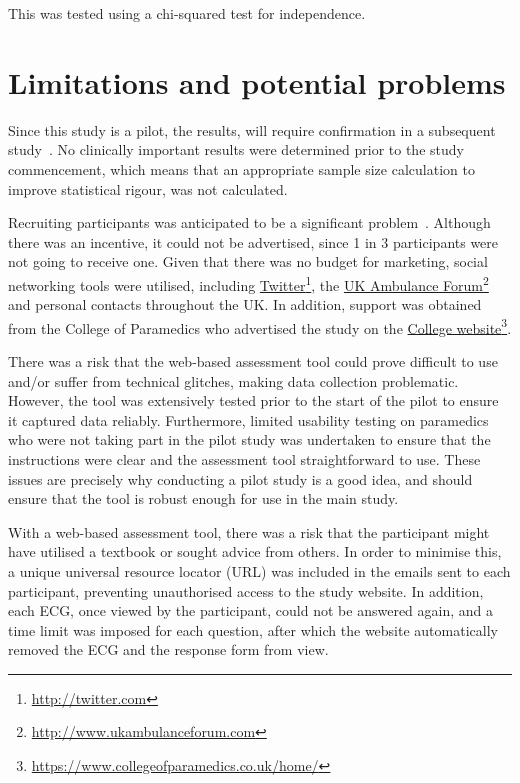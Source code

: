 This was tested using a chi-squared test for independence. 

\section{Limitations and potential problems}
\label{limitationsandpotentialproblems}

Since this study is a pilot, the results, will require confirmation in a subsequent study~\citep{torgerson_designing_2008}. No clinically important results were determined prior to the study commencement, which means that an appropriate sample size calculation to improve statistical rigour, was not calculated.

Recruiting participants was anticipated to be a significant problem~\citep{watson_increasing_2006}. Although there was an incentive, it could not be advertised, since 1 in 3 participants were not going to receive one. Given that there was no budget for marketing, social networking tools were utilised, including \href{http://twitter.com}{Twitter}\footnote{\href{http://twitter.com}{http:/\slash twitter.com}}, the \href{http://www.ukambulanceforum.com}{UK Ambulance Forum}\footnote{\href{http://www.ukambulanceforum.com}{http:/\slash www.ukambulanceforum.com}} and personal contacts throughout the UK. In addition, support was obtained from the College of Paramedics who advertised the study on the \href{https://www.collegeofparamedics.co.uk/home/}{College website}\footnote{\href{https://www.collegeofparamedics.co.uk/home/}{https:/\slash www.collegeofparamedics.co.uk\slash home\slash }}.

There was a risk that the web-based assessment tool could prove difficult to use and\slash or suffer from technical glitches, making data collection problematic. However, the tool was extensively tested prior to the start of the pilot to ensure it captured data reliably. Furthermore, limited usability testing on paramedics who were not taking part in the pilot study was undertaken to ensure that the instructions were clear and the assessment tool straightforward to use. These issues are precisely why conducting a pilot study is a good idea, and should ensure that the tool is robust enough for use in the main study.

With a web-based assessment tool, there was a risk that the participant might have utilised a textbook or sought advice from others. In order to minimise this, a unique universal resource locator (URL) was included in the emails sent to each participant, preventing unauthorised access to the study website. In addition, each ECG, once viewed by the participant, could not be answered again, and a time limit was imposed for each question, after which the website automatically removed the ECG and the response form from view.

